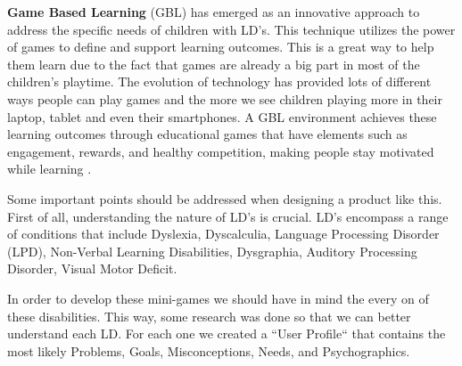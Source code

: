 \textbf{Game Based Learning} (GBL) has emerged as an innovative approach to address the specific needs of children with LD's. This technique utilizes the power of games to define and support learning outcomes. This is a great way to help them learn due to the fact that games are already a big part in most of the children's playtime. The evolution of technology has provided lots of different ways people can play games and the more we see children playing more in their laptop, tablet and even their smartphones. A GBL environment achieves these learning outcomes through educational games that have elements such as engagement, rewards, and healthy competition, making people stay motivated while learning \cite{gblProsCons}.


Some important points should be addressed when designing a product like this. First of all, understanding the nature of LD's is crucial. LD's encompass a range of conditions that include Dyslexia, Dyscalculia, Language Processing Disorder (LPD), Non-Verbal Learning Disabilities, Dysgraphia, Auditory Processing Disorder, Visual Motor Deficit.

In order to develop these mini-games we should have in mind the every on of these disabilities. This way, some research was done so that we can better understand each LD. For each one we created a ``User Profile`` that contains the most likely Problems, Goals, Misconceptions, Needs, and Psychographics.